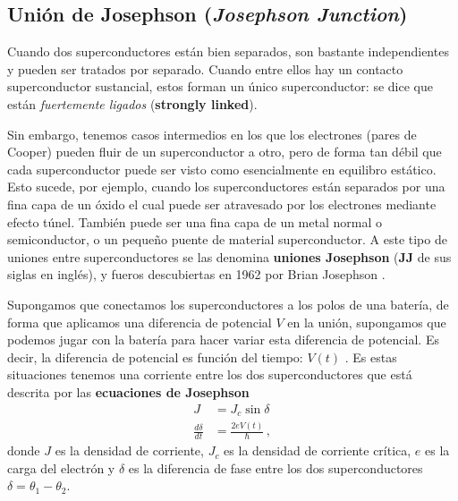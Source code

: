     \subsection{Unión de Josephson (\textit{Josephson Junction})} \label{sec_scq_Josephson}
    
    Cuando dos superconductores están bien separados, son bastante independientes y pueden ser tratados por separado. Cuando entre ellos hay un contacto superconductor sustancial, estos forman un único superconductor: se dice que están \textit{fuertemente ligados} (\textbf{strongly linked}). 
    
    Sin embargo, tenemos casos intermedios en los que los electrones (pares de Cooper) pueden fluir de un superconductor a otro, pero de forma tan débil que cada superconductor puede ser visto como esencialmente en equilibro estático. Esto sucede, por ejemplo, cuando los superconductores están separados por una fina capa de un óxido el cual puede ser atravesado por los electrones mediante efecto túnel. También puede ser una fina capa de un metal normal o semiconductor, o un pequeño puente de material superconductor. A este tipo de uniones entre superconductores se las denomina \textbf{uniones Josephson} (\textbf{JJ} de sus siglas en inglés), y fueros descubiertas en 1962 por Brian Josephson \cite{bib_Josephson_1962}.



        Supongamos que conectamos los superconductores a los polos de una batería, de forma que aplicamos una diferencia de potencial $V$ en la unión, supongamos que podemos jugar con la batería para hacer variar esta diferencia de potencial. Es decir, la diferencia de potencial es función del tiempo: $V(t)$ . Es estas situaciones tenemos una corriente entre los dos superconductores que está descrita por las \textbf{ecuaciones de Josephson}
        \begin{equation} \label{ec_scq_jj}
            \begin{aligned}
            J &= J_c \sin \delta \\
            \frac{d \delta}{dt} &= \frac{2eV(t)}{\hbar} \, ,
            \end{aligned}
        \end{equation}
        donde $J$ es la densidad de corriente, $J_c$ es la densidad de corriente crítica, $e$ es la carga del electrón y $\delta$ es la diferencia de fase entre los dos superconductores $\delta = \theta_1 - \theta_2$. 
        
